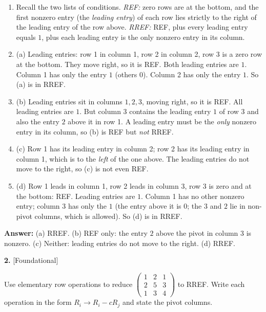 \documentclass[11pt]{article}
\begin{document}
\begin{tcolorbox}[breakable,colback=ans,colframe=ansb,boxrule=0.5pt,left=4pt,right=4pt,top=2pt,bottom=2pt]\begin{enumerate}[leftmargin=2.2em,itemsep=1pt,topsep=1pt,label=\textbf{Step \arabic*.}]\item Recall the two lists of conditions. \emph{REF:} zero rows are at the bottom, and the first nonzero entry (the \emph{leading entry}) of each row lies strictly to the right of the leading entry of the row above. \emph{RREF:} REF, plus every leading entry equals $1$, plus each leading entry is the only nonzero entry in its column.
\item (a) Leading entries: row 1 in column 1, row 2 in column 2, row 3 is a zero row at the bottom. They move right, so it is REF. Both leading entries are $1$. Column 1 has only the entry $1$ (others $0$). Column 2 has only the entry $1$. So (a) is in RREF.
\item (b) Leading entries sit in columns $1,2,3$, moving right, so it is REF. All leading entries are $1$. But column 3 contains the leading entry $1$ of row 3 and also the entry $2$ above it in row 1. A leading entry must be the \emph{only} nonzero entry in its column, so (b) is REF but \emph{not} RREF.
\item (c) Row 1 has its leading entry in column 2; row 2 has its leading entry in column 1, which is to the \emph{left} of the one above. The leading entries do not move to the right, so (c) is not even REF.
\item (d) Row 1 leads in column 1, row 2 leads in column 3, row 3 is zero and at the bottom: REF. Leading entries are $1$. Column 1 has no other nonzero entry; column 3 has only the $1$ (the entry above it is $0$; the $3$ and $2$ lie in non-pivot columns, which is allowed). So (d) is in RREF.
\end{enumerate}\textbf{Answer:} (a) RREF. (b) REF only: the entry $2$ above the pivot in column 3 is nonzero. (c) Neither: leading entries do not move to the right. (d) RREF.\end{tcolorbox}
\par\vspace{2pt}
\begin{minipage}{\linewidth}\textbf{2.} \hfill{\scriptsize\color{ink}[Foundational]}\par\nopagebreak Use elementary row operations to reduce $\begin{pmatrix}1 & 2 & 1 \\ 2 & 5 & 3 \\ 1 & 3 & 4\end{pmatrix}$ to RREF. Write each operation in the form $R_i\to R_i-cR_j$ and state the pivot columns.
\end{minipage}\par\nopagebreak
\end{document}
